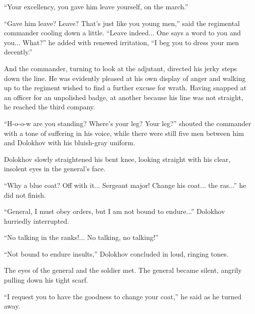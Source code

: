 ``Your excellency, you gave him leave yourself, on the march.''

``Gave him leave? Leave? That's just like you young men,'' said
the regimental commander cooling down a little. ``Leave
indeed... One says a word to you and you... What?'' he added with
renewed irritation, ``I beg you to dress your men decently.''

And the commander, turning to look at the adjutant, directed his
jerky steps down the line. He was evidently pleased at his own
display of anger and walking up to the regiment wished to find a
further excuse for wrath. Having snapped at an officer for an
unpolished badge, at another because his line was not straight,
he reached the third company.

``H-o-o-w are you standing? Where's your leg? Your leg?'' shouted
the commander with a tone of suffering in his voice, while there
were still five men between him and Dolokhov with his bluish-gray
uniform.

Dolokhov slowly straightened his bent knee, looking straight with
his clear, insolent eyes in the general's face.

``Why a blue coat? Off with it... Sergeant major! Change his
coat... the ras...'' he did not finish.

``General, I must obey orders, but I am not bound to endure...''
Dolokhov hurriedly interrupted.

``No talking in the ranks!... No talking, no talking!''

``Not bound to endure insults,'' Dolokhov concluded in loud,
ringing tones.

The eyes of the general and the soldier met. The general became
silent, angrily pulling down his tight scarf.

``I request you to have the goodness to change your coat,'' he
said as he turned away.


